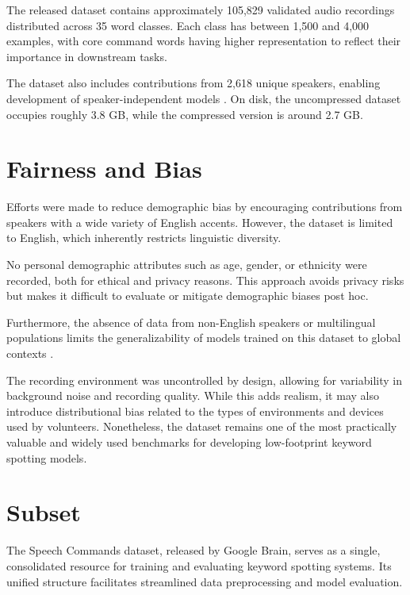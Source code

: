The released dataset contains approximately 105,829 validated audio recordings distributed across 35 word classes. Each class has between 1,500 and 4,000 examples, with core command words having higher representation to reflect their importance in downstream tasks.

\bigskip

The dataset also includes contributions from 2,618 unique speakers, enabling development of speaker-independent models \cite{Warden:2020}. On disk, the uncompressed dataset occupies roughly 3.8 GB, while the compressed version is around 2.7 GB.

\section{Fairness and Bias}

Efforts were made to reduce demographic bias by encouraging contributions from speakers with a wide variety of English accents. However, the dataset is limited to English, which inherently restricts linguistic diversity.

\bigskip

No personal demographic attributes such as age, gender, or ethnicity were recorded, both for ethical and privacy reasons. This approach avoids privacy risks but makes it difficult to evaluate or mitigate demographic biases post hoc.

\bigskip

Furthermore, the absence of data from non-English speakers or multilingual populations limits the generalizability of models trained on this dataset to global contexts \cite{Warden:2020}.

\bigskip

The recording environment was uncontrolled by design, allowing for variability in background noise and recording quality. While this adds realism, it may also introduce distributional bias related to the types of environments and devices used by volunteers. Nonetheless, the dataset remains one of the most practically valuable and widely used benchmarks for developing low-footprint keyword spotting models.


\section{Subset}

The Speech Commands dataset, released by Google Brain, serves as a single, consolidated resource for training and evaluating keyword spotting systems. Its unified structure facilitates streamlined data preprocessing and model evaluation.

